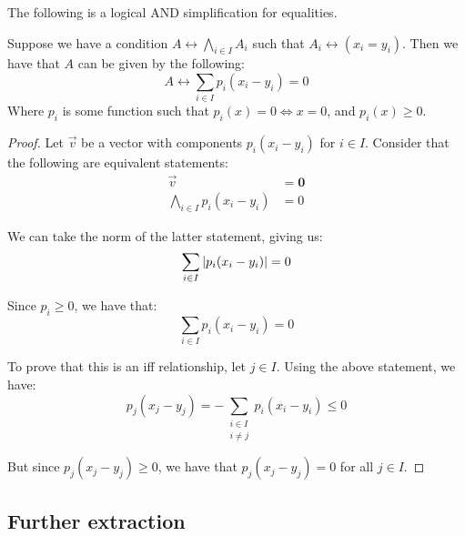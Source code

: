 \begin{theorem}
    The following is a logical AND simplification for equalities.

    Suppose we have a condition $A\leftrightarrow \displaystyle\bigwedge_{i\in I}{A_i}$ such that $A_i\leftrightarrow(x_i=y_i)$. Then we have that $A$ can be given by the following:
    $$
        A\leftrightarrow\sum_{i\in I}{p_i(x_i-y_i)}=0
    $$
    Where $p_i$ is some function such that $p_i(x)=0\iff x=0$, and $p_i(x)\geq 0$.

    \begin{proof}
        Let $\vec{v}$ be a vector with components $p_i(x_i-y_i)$ for $i\in I$. Consider that the following are equivalent statements:
        \begin{align*}
            \vec{v} &= \mathbf{0} \\
            \bigwedge_{i\in I}{p_i(x_i-y_i)} &= 0
        \end{align*}

        We can take the norm of the latter statement, giving us:
        $$
            \sum_{i\in I}{\abs{p_i(x_i-y_i)}}=0
        $$

        Since $p_i\geq 0$, we have that:
        $$
            \sum_{i\in I}{p_i(x_i-y_i)}=0
        $$

        To prove that this is an iff relationship, let $j\in I$. Using the above statement, we have:
        $$
            p_j(x_j-y_j)=-\sum_{\substack{i\in I\\i\neq j}}{p_i(x_i-y_i)}\leq 0
        $$

        But since $p_j(x_j-y_j)\geq 0$, we have that $p_j(x_j-y_j)=0$ for all $j\in I$.
    \end{proof}
\end{theorem}
\subsection{Further extraction}
\newpage